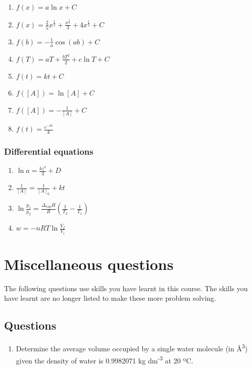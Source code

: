 \documentclass[
]{book}
\providecommand{\tightlist}{%
  \setlength{\itemsep}{0pt}\setlength{\parskip}{0pt}}
\begin{document}
\begin{enumerate}
\def\labelenumi{\arabic{enumi}.}
\tightlist
\item
  \(f (x) = a \ln x + C\)
\item
  \(f(x) = \frac{2}{5} x^{\frac{5}{2}}+ \frac{x^{\frac{3}{2}}}{3}+4x^{\frac{1}{2}}+C\)
\item
  \(f(b) =-\frac{1}{a}\cos (ab) + C\)
\item
  \(f(T) = aT + \frac{bT^2}{2} + c\ln T + C\)
\item
  \(f(t) = kt +C\)
\item
  \(f([A])= \ln [A] + C\)
\item
  \(f([A])=-\frac{1}{[A]}+ C\)
\item
  \(f(t) = \frac{e^{-kt}}{k}\)
\end{enumerate}

\hypertarget{differential-equations-1}{%
\subsection{Differential equations}\label{differential-equations-1}}

\begin{enumerate}
\def\labelenumi{\arabic{enumi}.}
\tightlist
\item
  \(\ln a = \frac{bz^3}{3}+D\)
\item
  \(\frac{1}{[A]}=\frac{1}{[A]_0}+ kt\)
\item
  \(\ln \frac{p_1}{p_2}=\frac{\Delta_{\textrm{vap}}H}{R}\left({\frac{1}{T_2}-\frac{1}{T_1}}\right)\)
\item
  \(w = -nRT \ln \frac{V_f}{V_i}\)
\end{enumerate}

\hypertarget{ch:questions}{%
\chapter{Miscellaneous questions}\label{ch:questions}}

The following questions use skills you have learnt in this course. The skills you have learnt are no longer listed to make these more problem solving.

\hypertarget{questions}{%
\section{Questions}\label{questions}}

\begin{enumerate}
\def\labelenumi{\arabic{enumi}.}
\tightlist
\item
  Determine the average volume occupied by a single water molecule (in Å\textsuperscript{3}) given the density of water is 0.9982071 kg dm\textsuperscript{-3} at 20 ºC.
\end{enumerate}
\end{document}
